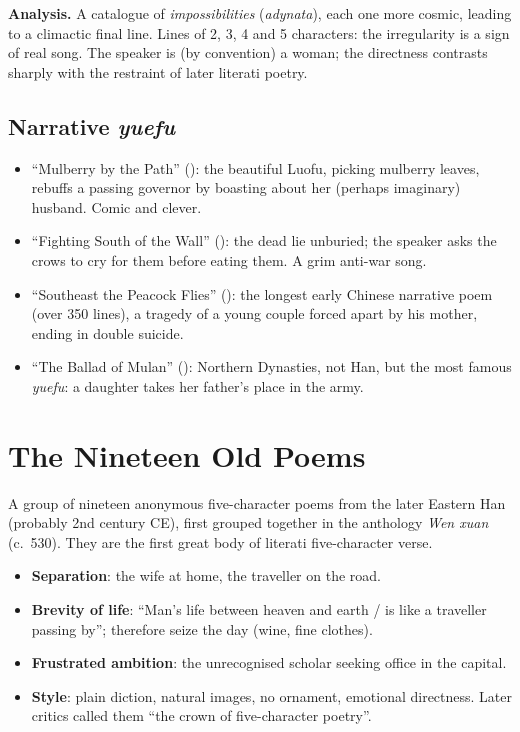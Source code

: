 \textbf{Analysis.} A catalogue of \emph{impossibilities} (\emph{adynata}), each one more
cosmic, leading to a climactic final line. Lines of 2, 3, 4 and 5 characters: the
irregularity is a sign of real song. The speaker is (by convention) a woman; the directness
contrasts sharply with the restraint of later literati poetry.

\subsection{Narrative \emph{yuefu}}

\begin{itemize}
  \item ``Mulberry by the Path'' (): the beautiful Luofu, picking mulberry
        leaves, rebuffs a passing governor by boasting about her (perhaps imaginary)
        husband. Comic and clever.
  \item ``Fighting South of the Wall'' (): the dead lie unburied; the speaker
        asks the crows to cry for them before eating them. A grim anti-war song.
  \item ``Southeast the Peacock Flies'' (): the longest early Chinese
        narrative poem (over 350 lines), a tragedy of a young couple forced apart by his
        mother, ending in double suicide.
  \item ``The Ballad of Mulan'' (): Northern Dynasties, not Han, but the most
        famous \emph{yuefu}: a daughter takes her father's place in the army.
\end{itemize}

\section{The Nineteen Old Poems }

A group of nineteen anonymous five-character poems from the later Eastern Han (probably
2nd century CE), first grouped together in the anthology \emph{Wen xuan} 
(c.\ 530). They are the first great body of literati five-character verse.

\begin{important}
\begin{itemize}
  \item \textbf{Separation}: the wife at home, the traveller on the road.
  \item \textbf{Brevity of life}: ``Man's life between heaven and earth / is like a
        traveller passing by''; therefore seize the day (wine, fine clothes).
  \item \textbf{Frustrated ambition}: the unrecognised scholar seeking office in the
        capital.
  \item \textbf{Style}: plain diction, natural images, no ornament, emotional directness.
        Later critics called them ``the crown of five-character poetry''.
\end{itemize}
\end{important}

